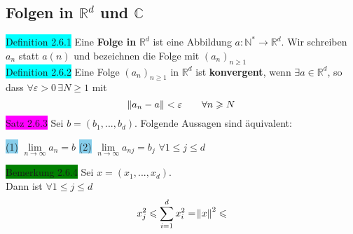 \documentclass[landscape, 10pt]{article}
\newcommand{\R}{\mathbb{R}}
\newcommand{\N}{\mathbb{N}}
\newcommand{\C}{\mathbb{C}}
\begin{document}
\begin{multicols}{3}
       \subsection{Folgen in $\R^d$ und $\C$}
              \colorbox{cyan}{Definition 2.6.1} 
                     Eine \textbf{Folge in} 
                     \textcolor{NavyBlue}{$\R^d$} 
                     ist eine Abbildung 
                     \textcolor{NavyBlue}{
                     $a:\N^*\longrightarrow\R^d$}. 
                     Wir schreiben $a_n$ statt $a(n)$ 
                     und bezeichnen die Folge mit 
                     \textcolor{NavyBlue}{
                     $(a_n)_{n\geqslant1}$}\\
              \colorbox{cyan}{Definition 2.6.2} 
                     Eine Folge \textcolor{NavyBlue}{
                     $(a_n)_{n\geqslant1}$} in 
                     \textcolor{NavyBlue}{$\R^d$} 
                     ist \textbf{konvergent}, wenn 
                     \textcolor{NavyBlue}{$\exists a\in\R^d$}, 
                     so dass
                     \textcolor{NavyBlue}{
                     $\forall\varepsilon >0\,\exists N\geqslant1$} 
                     mit 
                     \begin{equation*}
                            \norm{a_n-a}<\varepsilon
                            \qquad\forall n\geqslant N
                     \end{equation*}
              \colorbox{magenta}{Satz 2.6.3} 
                     Sei \textcolor{NavyBlue}{$b=(b_1,...,b_d)$}. 
                     Folgende Aussagen sind äquivalent:
                     \begin{multicols}{2}
                     \colorbox{SkyBlue}{(1)} 
                           \textcolor{NavyBlue}{$\lim\limits_{n\to\infty}a_n=b$}
                     \colorbox{SkyBlue}{(2)} 
                            \textcolor{NavyBlue}{
                            $\lim\limits_{n\to\infty}a_{nj}=b_j$\quad
                            $\forall 1\leqslant j\leqslant d$}
                     \end{multicols}
              \colorbox{green}{Bemerkung 2.6.4} 
                     Sei \textcolor{NavyBlue}{$x=(x_1,...,x_d)$}. \\
                     Dann ist 
                     \textcolor{NavyBlue}{
                     $\forall 1\leqslant j\leqslant d$}
                     \begin{align*}
                            x^2_j\leqslant\sum_{i=1}^{d}x_i^2=\norm{x}^2\leqslant 

\end{align*}
\end{multicols}
\end{document}
